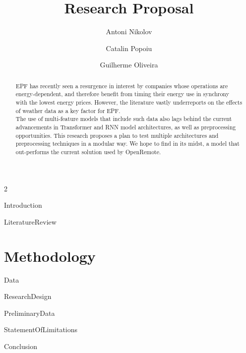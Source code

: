 \documentclass[print]{styledarticle}
\title{Research Proposal}
\author{Antoni Nikolov \and Catalin Popoiu \and Guilherme Oliveira}
\date{}
\begin{document}
\maketitle

\begin{multicols*}{2}
    \begin{abstract}
        EPF has recently seen a resurgence in interest by companies whose operations are energy-dependent, and therefore benefit from timing their energy use in synchrony with the lowest energy prices. However, the
        literature vastly underreports on the effects of weather data as a key factor for EPF.\\ The use of multi-feature models that include such data also lags behind the current advancements in Transformer and RNN model architectures,
        as well as preprocessing opportunities. This research proposes a plan to test multiple architectures and preprocessing techniques in a modular way.
        We hope to find in its midst, a model that out-performs the current solution used by OpenRemote.
    \end{abstract}

    {Introduction}

    {LiteratureReview}

    \section{Methodology}
        {Data}

        {ResearchDesign}

    {PreliminaryData}

    {StatementOfLimitations}

    {Conclusion}
\end{multicols*}



\end{document}
